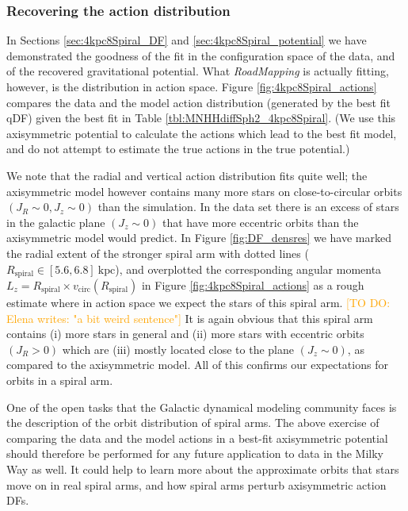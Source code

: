 \documentclass[iop,revtex4,numberedappendix,appendixfloats]{emulateapj}
\newcommand{\RM}{{\sl RoadMapping}}
\newcommand{\Elena}[1]{\textcolor{Orange}{#1}}
\begin{document}
\subsubsection{Recovering the action distribution} \label{sec:4kpc8Spiral_actions}

In Sections \ref{sec:4kpc8Spiral_DF} and \ref{sec:4kpc8Spiral_potential} we have demonstrated the goodness of the fit in the configuration space of the data, and of the recovered gravitational potential. What \RM{} is actually fitting, however, is the distribution in action space. Figure \ref{fig:4kpc8Spiral_actions} compares the data and the model action distribution (generated by the best fit qDF) given the best fit  in Table \ref{tbl:MNHHdiffSph2_4kpc8Spiral}. (We use this axisymmetric potential to calculate the actions which lead to the best fit model, and do not attempt to estimate the true actions in the true potential.)

We note that the radial and vertical action distribution fits quite well; the axisymmetric model however contains many more stars on close-to-circular orbits $(J_R \sim 0,J_z \sim 0)$ than the simulation. In the data set there is an excess of stars in the galactic plane $(J_z\sim0)$ that have more eccentric orbits  than the axisymmetric model would predict. In Figure \ref{fig:DF_densres} we have marked the radial extent of the stronger spiral arm with dotted lines ($R_\text{spiral} \in [5.6,6.8]~\text{kpc}$), and overplotted the corresponding angular momenta $L_z = R_\text{spiral} \times v_\text{circ}(R_\text{spiral})$ in Figure \ref{fig:4kpc8Spiral_actions} as a rough estimate where in action space we expect the stars of this spiral arm. \Elena{[TO DO: Elena writes: "a bit weird sentence"]} It is again obvious that this spiral arm contains (i) more stars in general and (ii) more stars with eccentric orbits  $(J_R>0)$ which are (iii) mostly located close to the plane $(J_z\sim0)$, as compared to the axisymmetric model. All of this confirms our expectations for orbits in a spiral arm. 

One of the open tasks that the Galactic dynamical modeling community faces is the description of the orbit distribution of spiral arms. The above exercise of comparing the data and the model actions in a best-fit axisymmetric potential should therefore be performed for any future application to data in the Milky Way as well. It could help to learn more about the approximate orbits that stars move on in real spiral arms, and how spiral arms perturb axisymmetric action DFs.
\end{document}
